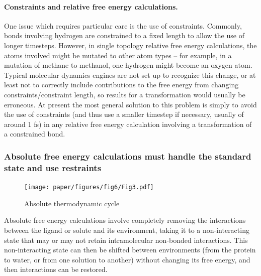 \documentclass[9pt,bestpractices]{livecoms}
\begin{document}
\paragraph{Constraints and relative free energy calculations.}
One issue which requires particular care is the use of constraints.
Commonly, bonds involving hydrogen are constrained to a fixed length to allow the use of longer timesteps.
However, in single topology relative free energy calculations, the atoms involved might be mutated to other atom types -- for example, in a mutation of methane to methanol, one hydrogen might become an oxygen atom.
Typical molecular dynamics engines are not set up to recognize this change, or at least not to correctly include contributions to the free energy from changing constraints/constraint length, so results for a transformation would usually be erroneous.
At present the most general solution to this problem is simply to avoid the use of constraints (and thus use a smaller timestep if necessary, usually of around 1 fs) in any relative free energy calculation involving a transformation of a constrained bond.

\subsubsection*{Absolute free energy calculations must handle the standard state and use restraints}
\label{sec:standardstate-restraints}



\begin{figure}
    \texttt{[image: paper/figures/fig6/Fig3.pdf]}
    \caption{Absolute thermodynamic cycle}
    \label{fig:fig1}
\end{figure}

Absolute free energy calculations involve completely removing the interactions between the ligand or solute and its environment, taking it to a non-interacting state that may or may not retain intramolecular non-bonded interactions.
This non-interacting state can then be shifted between environments (from the protein to water, or from one solution to another) without changing its free energy, and then interactions can be restored.
\end{document}

